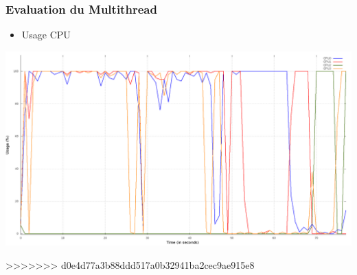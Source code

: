 
\begin{frame}
  \frametitle{Evaluation du Multithread}

  \begin{itemize}
  \item Usage CPU
  \end{itemize}

  \begin{center}
    \includegraphics[scale=0.24]{include/cpu_usage.png}
  \end{center}

\end{frame}

>>>>>>> d0e4d77a3b88ddd517a0b32941ba2cec9ae915e8
